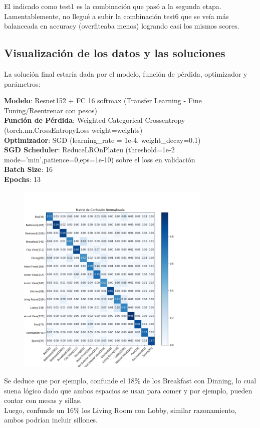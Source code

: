 \documentclass{article}[9pt]
\begin{document}
El indicado como test1 es la combinación que pasó a la segunda etapa. Lamentablemente, no llegué a subir la combinación test6 que se veía más balanceada en accuracy (overfiteaba menos) logrando casi los mismos scores.

\subsection{Visualización de los datos y las soluciones}

La solución final estaría dada por el modelo, función de pérdida, optimizador y parámetros:


\begin{scriptsize}

\textbf{Modelo}: Resnet152 + FC 16 softmax (Transfer Learning - Fine Tuning/Reentrenar con pesos)\\
\textbf{Función de Pérdida}: Weighted Categorical Crossentropy (torch.nn.CrossEntropyLoss weight=weights)\\
\textbf{Optimizador}: SGD (learning\_rate = 1e-4, weight\_decay=0.1) \\
\textbf{SGD Scheduler}: ReduceLROnPlateu (threshold=1e-2 mode='min',patience=0,eps=1e-10) sobre el loss en validación\\
\textbf{Batch Size}: 16\\
\textbf{Epochs}: 13 
\end{scriptsize}
\begin{figure}[H]
\centering
    \includegraphics[width=350px]{img/confmat.png}
\end{figure}

Se deduce que por ejemplo, confunde el 18\% de los Breakfast con Dinning, lo cual suena lógico dado que ambos espacios se usan para comer y por ejemplo, pueden contar con mesas y sillas. \\
Luego, confunde un 16\% los Living Room con Lobby, similar razonamiento, ambos podrían incluir sillones. 
\end{document}
